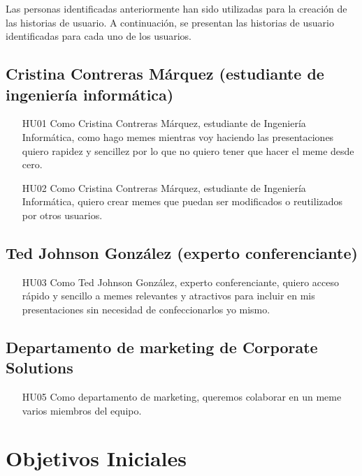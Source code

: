 Las personas identificadas anteriormente han sido utilizadas para la creación de las historias de usuario. A continuación, se presentan las historias de usuario identificadas para cada uno de los usuarios.

\subsection{Cristina Contreras Márquez (estudiante de ingeniería informática)}

\begin{enumerate}
    \item [HU01] Como Cristina Contreras Márquez, estudiante de Ingeniería Informática, como hago memes mientras voy haciendo las presentaciones quiero rapidez y sencillez por lo que no quiero tener que hacer el meme desde cero.
    \item [HU02] Como Cristina Contreras Márquez, estudiante de Ingeniería Informática, quiero crear memes que puedan ser modificados o reutilizados por otros usuarios.
\end{enumerate}

\subsection{Ted Johnson González (experto conferenciante)}

\begin{enumerate}
    \item [HU03] Como Ted Johnson González, experto conferenciante, quiero acceso rápido y sencillo a memes relevantes y atractivos para incluir en mis presentaciones sin necesidad de confeccionarlos yo mismo.
\end{enumerate}

\subsection{Departamento de marketing de Corporate Solutions}

\begin{enumerate}
    \item [HU05] Como departamento de marketing, queremos colaborar en un meme varios miembros del equipo.
\end{enumerate}

\section{Objetivos Iniciales}~\label{sec:objetivos_iniciales}

